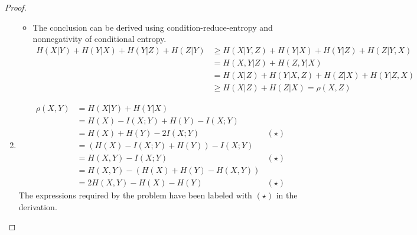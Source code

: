 \begin{exercise}[Metric]
\begin{proof}
\begin{enumerate}
{\begin{itemize}
          On the other hand, if \(\rho(X,Y)= H(X | Y)+H(Y|X)=0\)
          Since $H(X | Y) \geqslant 0 , \quad H(Y(X) \geqslant 0$ 
          By the conclusion in Exercise 2, Assignment 1, there exists a one-to-one mapping between $X$ and $Y$.
          \item The conclusion can be derived using condition-reduce-entropy and nonnegativity of conditional entropy.
            \begin{equation}\begin{aligned}
            H(X | Y)+H(Y | X)+H(Y|Z)+H(Z | Y) & \geqslant H(X| Y,Z)+H(Y | X )+H(Y | Z)+H(Z | Y,X) \\
            &=H(X, Y | Z)+H(Z, Y | X) \\
            &=H(X | Z)+H(Y | X,Z)+H(Z | X)+H(Y | Z,X) \\
            &\geqslant H(X | Z)+H(Z | X)=\rho(X, Z)
            \end{aligned}\end{equation}
        \end{itemize}
        }
        \item {
          \begin{equation}\begin{aligned}
          \rho(X,Y)&=H(X | Y)+H(Y | X)&\\
          &=H(X)-I(X ; Y)+H(Y)-I(X ; Y) &\\
          &=H(X)+H(Y)-2 I(X ; Y) & (\star)\\
          &=(H(X)-I(X ; Y)+H(Y))-I(X ; Y)& \\
          &=H(X,Y)-I(X ; Y) & (\star)\\
          &=H(X,Y)-(H(X)+H(Y)-H(X,Y)) &\\
          &=2 H(X, Y)-H(X)-H(Y) & (\star)
          \end{aligned}\end{equation}
          The expressions required by the problem have been labeled with $(\star)$ in the derivation.
        }
      \end{enumerate}


  \end{proof}
  \end{exercise}

